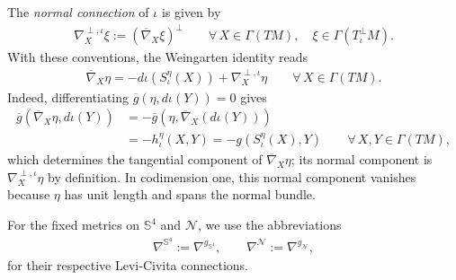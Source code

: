 \documentclass[a4paper,11pt,oneside,reqno]{amsart}
\numberwithin{equation}{section}
\theoremstyle{definition}
\begin{document}
The \textit{normal connection} of $\iota$ is given by
%
\begin{align*}
    \nabla^{\perp,\iota}_X\xi
    :=(\overline\nabla_X\xi)^\perp
    \qquad\forall\,X\in\Gamma(TM),\quad
    \xi\in\Gamma(T^\perp_\iota M).
\end{align*}
%
With these conventions, the Weingarten identity reads
%
\begin{align}
    \label{eq:s4-weingarten-convention}
    \overline\nabla_X\eta
    =-d\iota(S_\iota^\eta(X))
    +\nabla^{\perp,\iota}_X\eta
    \qquad\forall\,X\in\Gamma(TM).
\end{align}
%
Indeed, differentiating $\overline g(\eta,d\iota(Y))=0$
gives
%
\begin{align*}
    \overline g(\overline\nabla_X\eta,d\iota(Y))
    &=-\overline g(\eta,\overline\nabla_X(d\iota(Y)))\\
    &=-h_\iota^\eta(X,Y)
    =-g(S_\iota^\eta(X),Y)
    \qquad\forall\,X,Y\in\Gamma(TM),
\end{align*}
%
which determines the tangential component of
$\overline\nabla_X\eta$; its normal component is
$\nabla^{\perp,\iota}_X\eta$ by definition.
In codimension one, this normal component vanishes because
$\eta$ has unit length and spans the normal bundle.

For the fixed metrics on $\mathbb{S}^4$ and $\mathcal{N}$,
we use the abbreviations
%
\begin{align*}
    \nabla^{\mathbb{S}^4}:=\nabla^{g_{\mathbb{S}^4}},
    \qquad
    \nabla^{\mathcal{N}}:=\nabla^{g_{\mathcal{N}}},
\end{align*}
%
for their respective Levi-Civita connections.
\end{document}
